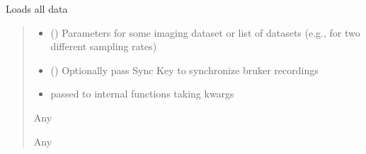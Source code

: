 \documentclass[letterpaper,10pt,english]{sphinxmanual}
\begin{document}
\begin{fulllineitems}
\begin{fulllineitems}
\label{\detokenize{ExperimentHierarchy:ExperimentHierarchy.ExperimentStage.load_data}}
\pysigstartsignatures
{}
\pysigstopsignatures
\sphinxAtStartPar
Loads all data
\begin{quote}\begin{description}
\begin{itemize}
\item {} 
\sphinxAtStartPar
{} (\sphinxstyleliteralemphasis{\sphinxupquote{{[}}}\sphinxstyleliteralemphasis{\sphinxupquote{{]}}}) \textendash{} Parameters for some imaging dataset or list of datasets (e.g., for two different sampling rates)

\item {} 
\sphinxAtStartPar
{} (\sphinxstyleliteralemphasis{\sphinxupquote{{[}}}\sphinxstyleliteralemphasis{\sphinxupquote{, }}\sphinxstyleliteralemphasis{\sphinxupquote{{]}}}) \textendash{} Optionally pass Sync Key to synchronize bruker recordings

\item {} 
\sphinxAtStartPar
{} \textendash{} passed to internal functions taking kwargs

\end{itemize}

\sphinxAtStartPar
Any

\sphinxAtStartPar
Any

\end{description}\end{quote}


\end{fulllineitems}
\end{fulllineitems}
\end{document}
